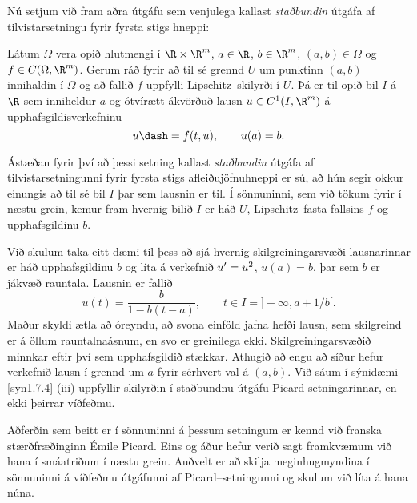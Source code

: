 Nú setjum við fram aðra útgáfu sem venjulega
kallast {\it staðbundin} útgáfa af tilvistarsetningu fyrir fyrsta
stigs hneppi:


\begin{se}\label{set1.7.8}{}
Látum $\Omega$ vera opið hlutmengi í $\R\times \R\sp{m}$,
$a\in \R$, $b\in \R\sp m$,
$(a,b)\in \Omega$  og $f\in C(\Omega,\R\sp m)$. Gerum ráð fyrir að
til sé grennd $U$ um punktinn $(a,b)$ innihaldin í $\Omega$ og að
fallið $f$ uppfylli Lipschitz--skilyrði í $U$.  Þá
er til opið bil $I$ á $\R$ sem inniheldur $a$ og ótvírætt ákvörðuð lausn
$u\in C\sp 1(I, \R^m)$ á upphafsgildisverkefninu 
 $$u\dash=f(t,u), \qquad u(a)=b.
 $$
\end{se}

Ástæðan fyrir því að þessi setning kallast {\it staðbundin}  útgáfa
af tilvistarsetningunni fyrir fyrsta stigs afleiðujöfnuhneppi er sú,
að hún segir okkur einungis að til sé bil $I$ þar sem lausnin er til.
Í sönnuninni, sem við tökum fyrir í næstu grein, 
kemur fram hvernig bilið $I$ er háð
$U$,  Lipschitz--fasta fallsins $f$ og upphafsgildinu $b$.  

\begin{sy}  Við skulum taka eitt dæmi til þess að sjá hvernig 
skilgreiningarsvæði
lausnarinnar er háð upphafsgildinu $b$ og líta á verkefnið $u'=u\sp
2$, $u(a)=b$, þar sem $b$ er jákvæð rauntala.  Lausnin er fallið
 $$u(t)=\dfrac b{1-b(t-a)}, \qquad t\in I=]-\infty,a+1/b[.
 $$
Maður skyldi ætla að óreyndu, að svona einföld jafna hefði lausn, sem
skilgreind er á öllum rauntalnaásnum, en svo er greinilega ekki.
Skilgreiningarsvæðið minnkar eftir því sem upphafsgildið 
stækkar.   Athugið að engu að síður hefur verkefnið lausn í grennd
um $a$ fyrir sérhvert val á $(a,b)$.  Við sáum í sýnidæmi
\ref{syn1.7.4} (iii) uppfyllir skilyrðin í staðbundnu útgáfu Picard
setningarinnar, en ekki þeirrar víðfeðmu.  
\end{sy}

Aðferðin sem beitt er í sönnuninni á  þessum setningum er kennd
við franska stærðfræðinginn Émile Picard.  Eins og áður hefur verið
sagt framkvæmum við hana í smáatriðum í næstu grein.
Auðvelt er að skilja meginhugmyndina í sönnuninni á víðfeðmu útgáfunni
af Picard--setningunni og skulum við líta á hana núna.

